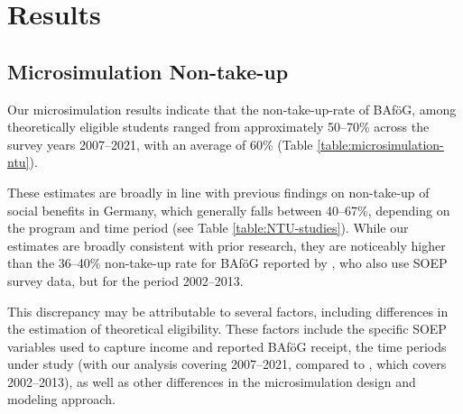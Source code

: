 \section{Results}

\subsection{Microsimulation Non-take-up}
Our microsimulation results indicate that the non-take-up-rate of BAföG, among theoretically eligible students ranged from approximately 50--70\% across the survey years 2007--2021, with an average of 60\%  (Table \ref{table:microsimulation-ntu}).

These estimates are broadly in line with previous findings on non-take-up of social benefits in Germany, which generally falls between 40--67\%, depending on the program and time period (see Table \ref{table:NTU-studies}). 
While our estimates are broadly consistent with prior research, they are noticeably higher than the 36--40\% non-take-up rate for BAföG reported by \cite{herber_non-take-up_2019}, who also use SOEP survey data, but for the period 2002--2013.

This discrepancy may be attributable to several factors, including differences in the estimation of theoretical eligibility. These factors include the specific SOEP variables used to capture income and reported BAföG receipt, the time periods under study (with our analysis covering 2007--2021, compared to \cite{herber_non-take-up_2019}, which covers 2002--2013), as well as other differences in the microsimulation design and modeling approach.



